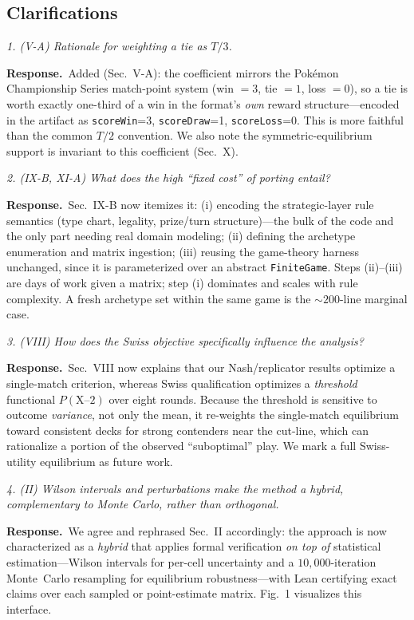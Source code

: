 \documentclass[11pt]{article}
\newcommand{\cmt}[1]{\par\smallskip\noindent\textit{#1}\par\smallskip}
\newcommand{\resp}{\par\noindent\textbf{Response.}\ }
\begin{document}
\subsection*{Clarifications}
\cmt{1. (V-A) Rationale for weighting a tie as $T/3$.}
\resp Added (Sec.~V-A): the coefficient mirrors the Pok\'emon Championship Series
match-point system (win $=3$, tie $=1$, loss $=0$), so a tie is worth exactly
one-third of a win in the format's \emph{own} reward structure---encoded in the
artifact as \texttt{scoreWin}=3, \texttt{scoreDraw}=1, \texttt{scoreLoss}=0. This
is more faithful than the common $T/2$ convention. We also note the
symmetric-equilibrium support is invariant to this coefficient (Sec.~X).

\cmt{2. (IX-B, XI-A) What does the high ``fixed cost'' of porting entail?}
\resp Sec.~IX-B now itemizes it: (i) encoding the strategic-layer rule semantics
(type chart, legality, prize/turn structure)---the bulk of the code and the only
part needing real domain modeling; (ii) defining the archetype enumeration and
matrix ingestion; (iii) reusing the game-theory harness unchanged, since it is
parameterized over an abstract \texttt{FiniteGame}. Steps (ii)--(iii) are days of
work given a matrix; step (i) dominates and scales with rule complexity. A fresh
archetype set within the same game is the ${\sim}200$-line marginal case.

\cmt{3. (VIII) How does the Swiss objective specifically influence the analysis?}
\resp Sec.~VIII now explains that our Nash/replicator results optimize a
single-match criterion, whereas Swiss qualification optimizes a \emph{threshold}
functional $P(\text{X--2})$ over eight rounds. Because the threshold is sensitive
to outcome \emph{variance}, not only the mean, it re-weights the single-match
equilibrium toward consistent decks for strong contenders near the cut-line,
which can rationalize a portion of the observed ``suboptimal'' play. We mark a
full Swiss-utility equilibrium as future work.

\cmt{4. (II) Wilson intervals and perturbations make the method a hybrid,
complementary to Monte Carlo, rather than orthogonal.}
\resp We agree and rephrased Sec.~II accordingly: the approach is now characterized
as a \emph{hybrid} that applies formal verification \emph{on top of} statistical
estimation---Wilson intervals for per-cell uncertainty and a $10{,}000$-iteration
Monte~Carlo resampling for equilibrium robustness---with Lean certifying exact
claims over each sampled or point-estimate matrix. Fig.~1 visualizes this
interface.
\end{document}
